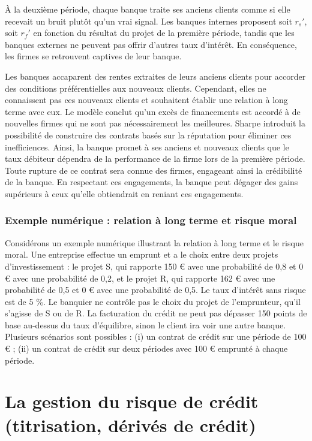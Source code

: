 \documentclass[a4paper, 12pt]{report}
\begin{document}
À la deuxième période, chaque banque traite ses anciens clients comme si elle recevait un bruit plutôt qu'un vrai signal. Les banques internes proposent soit \( r_s' \), soit \( r_f' \) en fonction du résultat du projet de la première période, tandis que les banques externes ne peuvent pas offrir d'autres taux d'intérêt. En conséquence, les firmes se retrouvent captives de leur banque.

Les banques accaparent des rentes extraites de leurs anciens clients pour accorder des conditions préférentielles aux nouveaux clients. Cependant, elles ne connaissent pas ces nouveaux clients et souhaitent établir une relation à long terme avec eux. Le modèle conclut qu'un excès de financements est accordé à de nouvelles firmes qui ne sont pas nécessairement les meilleures. Sharpe introduit la possibilité de construire des contrats basés sur la réputation pour éliminer ces inefficiences. Ainsi, la banque promet à ses anciens et nouveaux clients que le taux débiteur dépendra de la performance de la firme lors de la première période. Toute rupture de ce contrat sera connue des firmes, engageant ainsi la crédibilité de la banque. En respectant ces engagements, la banque peut dégager des gains supérieurs à ceux qu'elle obtiendrait en reniant ces engagements.

\subsubsection{Exemple numérique : relation à long terme et risque moral}

Considérons un exemple numérique illustrant la relation à long terme et le risque moral. Une entreprise effectue un emprunt et a le choix entre deux projets d'investissement : le projet S, qui rapporte 150 € avec une probabilité de 0,8 et 0 € avec une probabilité de 0,2, et le projet R, qui rapporte 162 € avec une probabilité de 0,5 et 0 € avec une probabilité de 0,5. Le taux d'intérêt sans risque est de 5 \%. Le banquier ne contrôle pas le choix du projet de l'emprunteur, qu'il s'agisse de S ou de R. La facturation du crédit ne peut pas dépasser 150 points de base au-dessus du taux d'équilibre, sinon le client ira voir une autre banque. Plusieurs scénarios sont possibles : (i) un contrat de crédit sur une période de 100 € ; (ii) un contrat de crédit sur deux périodes avec 100 € emprunté à chaque période.


\section{La gestion du risque de crédit (titrisation, dérivés de crédit)}
\end{document}

